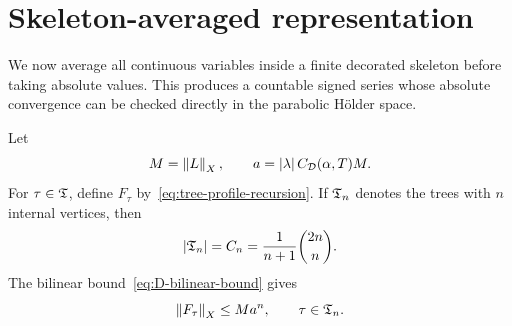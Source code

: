 \section{Skeleton-averaged representation}
\label{sec:cprime}

We now average all continuous variables inside a finite decorated skeleton before taking absolute values. This produces a countable signed series whose absolute convergence can be checked directly in the parabolic H\"older space.

Let
\begin{equation*}
  M=\left\lVert L\right\rVert_X,
  \qquad
  a=\left|\lambda\right| C_{\mathcal D}(\alpha,T)M.
\end{equation*}
For $\tau\in\mathfrak T$, define $F_\tau$ by~\eqref{eq:tree-profile-recursion}. If $\mathfrak T_n$ denotes the trees with $n$ internal vertices, then
\begin{equation*}
  \left|\mathfrak T_n\right|
  =
  C_n
  =
  \frac1{n+1}\binom{2n}{n}.
\end{equation*}
The bilinear bound~\eqref{eq:D-bilinear-bound} gives
\begin{equation}
  \left\lVert F_\tau\right\rVert_X
  \leq
  Ma^n,
  \qquad \tau\in\mathfrak T_n.
  \label{eq:Cprime-tree-bound}
\end{equation}

